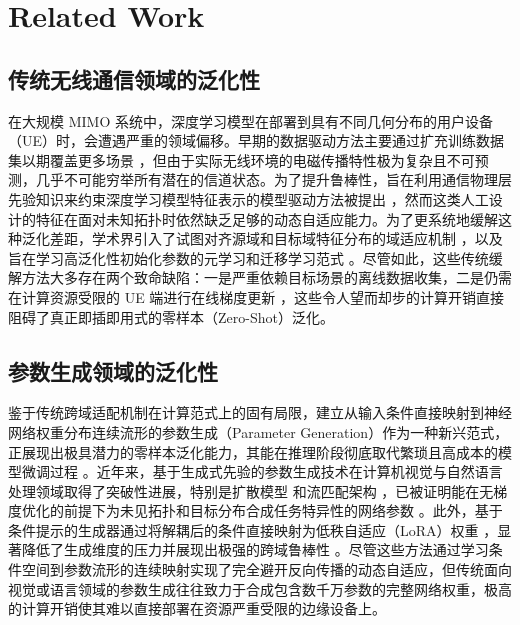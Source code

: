 \documentclass[12pt,a4paper]{article}
\begin{document}
\section{Related Work}

\subsection{传统无线通信领域的泛化性}
在大规模 MIMO 系统中，深度学习模型在部署到具有不同几何分布的用户设备（UE）时，会遭遇严重的领域偏移。早期的数据驱动方法主要通过扩充训练数据集以期覆盖更多场景 \cite{wen2018csinet, guo2020overview, jin2021transnet, mashhadi2020pruning, sun2022generalization}，但由于实际无线环境的电磁传播特性极为复杂且不可预测，几乎不可能穷举所有潜在的信道状态。为了提升鲁棒性，旨在利用通信物理层先验知识来约束深度学习模型特征表示的模型驱动方法被提出 \cite{he2019model}，然而这类人工设计的特征在面对未知拓扑时依然缺乏足够的动态自适应能力。为了更系统地缓解这种泛化差距，学术界引入了试图对齐源域和目标域特征分布的域适应机制 \cite{feng2023ddanet, da2025_mimo, da2025_doa}，以及旨在学习高泛化性初始化参数的元学习和迁移学习范式 \cite{finn2017model, lu2021transfer, yuan2021meta, park2021meta, zhao2025enhanced, meta2025_csi, knowledge_meta2024}。尽管如此，这些传统缓解方法大多存在两个致命缺陷：一是严重依赖目标场景的离线数据收集，二是仍需在计算资源受限的 UE 端进行在线梯度更新 \cite{generalizable2025_csi, transfer2024_online}，这些令人望而却步的计算开销直接阻碍了真正即插即用式的零样本（Zero-Shot）泛化。

\subsection{参数生成领域的泛化性}
鉴于传统跨域适配机制在计算范式上的固有局限，建立从输入条件直接映射到神经网络权重分布连续流形的参数生成（Parameter Generation）作为一种新兴范式，正展现出极具潜力的零样本泛化能力，其能在推理阶段彻底取代繁琐且高成本的模型微调过程 \cite{ha2016hypernetworks}。近年来，基于生成式先验的参数生成技术在计算机视觉与自然语言处理领域取得了突破性进展，特别是扩散模型 \cite{ho2020denoising, peebles2023diffusion, peebles2022learning} 和流匹配架构 \cite{flowmatch2025_dynamics}，已被证明能在无梯度优化的前提下为未见拓扑和目标分布合成任务特异性的网络参数 \cite{wang2024neural, zhang2023neural, nnit2026_diffusion, d2nwg2025}。此外，基于条件提示的生成器通过将解耦后的条件直接映射为低秩自适应（LoRA）权重 \cite{hu2021lora}，显著降低了生成维度的压力并展现出极强的跨域鲁棒性 \cite{dnd2025_llm}。尽管这些方法通过学习条件空间到参数流形的连续映射实现了完全避开反向传播的动态自适应，但传统面向视觉或语言领域的参数生成往往致力于合成包含数千万参数的完整网络权重，极高的计算开销使其难以直接部署在资源严重受限的边缘设备上。
\end{document}
